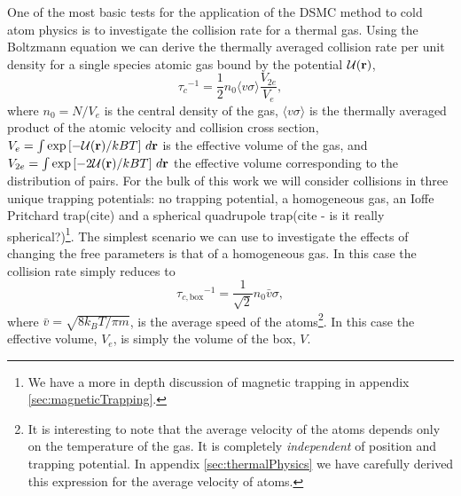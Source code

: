 One of the most basic tests for the application of the DSMC method to cold atom physics is to investigate the collision rate for a thermal gas. 
Using the Boltzmann equation we can derive \cite{Walraven2010} the thermally averaged collision rate per unit density for a single species atomic gas bound by the potential ${\cal U}(\mathbf{r})$,
\begin{equation}
    {\tau_c}^{-1} = \frac{1}{2} n_{0}\langle v\sigma \rangle \frac{V_{2e}}{V_e},
\end{equation}
where $n_0 = N / V_e$ is the central density of the gas, $\langle v\sigma \rangle$ is the thermally averaged product of the atomic velocity and collision cross section, $V_e = \int \exp\left[-{\cal U}(\mathbf{r})/kBT\right]\, d\mathbf{r}$ is the effective volume of the gas, and $V_{2e} = \int \exp\left[-2{\cal U}(\mathbf{r})/kBT\right]\, d\mathbf{r}$ the effective volume corresponding to the distribution of pairs.
For the bulk of this work we will consider collisions in three unique trapping potentials: no trapping potential, \ie a homogeneous gas, an Ioffe Pritchard trap(cite) and a spherical quadrupole trap(cite - is it really spherical?)\footnote{We have a more in depth discussion of magnetic trapping in appendix \ref{sec:magneticTrapping}.}.
The simplest scenario we can use to investigate the effects of changing the free parameters is that of a homogeneous gas. 
In this case the collision rate simply reduces to 
\begin{equation*}
    {\tau_{c,\mathrm{box}}}^{-1} = \frac{1}{\sqrt{2}}n_0\bar{v}\sigma,
\end{equation*}
where $\bar{v}=\sqrt{8k_{B}T/\pi m}$, is the average speed of the atoms\footnote{It is interesting to note that the average velocity of the atoms depends only on the temperature of the gas. It is completely \emph{independent} of position and trapping potential. In appendix \ref{sec:thermalPhysics} we have carefully derived this expression for the average velocity of atoms.}. In this case the effective volume, $V_e$, is simply the volume of the box, $V$.

